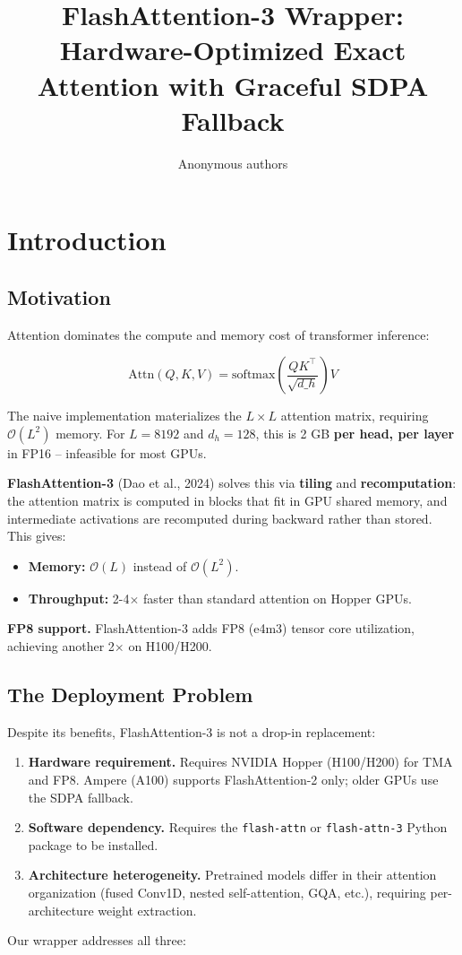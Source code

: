 \title{\textbf{FlashAttention-3 Wrapper: Hardware-Optimized Exact Attention with Graceful SDPA Fallback}}

\author{Anonymous authors}


\section{Introduction}

\subsection{Motivation}

Attention dominates the compute and memory cost of transformer inference:

\[
\text{Attn}(Q, K, V) = \text{softmax}\!\left(\frac{Q K^\top}{\sqrt{d\_h}}\right) V
\tag{1.1}
\]

The naive implementation materializes the $L \times L$ attention matrix, 
requiring $\mathcal{O}(L^2)$ memory. For $L = 8192$ and $d_h = 128$, this 
is 2 GB \textbf{per head, per layer} in FP16 -- infeasible for most GPUs.

\textbf{FlashAttention-3} (Dao et al., 2024) solves this via \textbf{tiling} and 
\textbf{recomputation}: the attention matrix is computed in blocks that fit in 
GPU shared memory, and intermediate activations are recomputed during 
backward rather than stored. This gives:

\begin{itemize}
\item \textbf{Memory:} $\mathcal{O}(L)$ instead of $\mathcal{O}(L^2)$.
\item \textbf{Throughput:} 2-4$\times$ faster than standard attention on Hopper GPUs.

\end{itemize}
\textbf{FP8 support.} FlashAttention-3 adds FP8 (e4m3) tensor core utilization, 
achieving another 2$\times$ on H100/H200.

\subsection{The Deployment Problem}

Despite its benefits, FlashAttention-3 is not a drop-in replacement:

\begin{enumerate}
\item \textbf{Hardware requirement.} Requires NVIDIA Hopper (H100/H200) for
  TMA and FP8. Ampere (A100) supports FlashAttention-2 only; older GPUs
  use the SDPA fallback.
\item \textbf{Software dependency.} Requires the \texttt{flash-attn} or \texttt{flash-attn-3}
  Python package to be installed.
\item \textbf{Architecture heterogeneity.} Pretrained models differ in their
  attention organization (fused Conv1D, nested self-attention, GQA, etc.),
  requiring per-architecture weight extraction.

\end{enumerate}
Our wrapper addresses all three:

